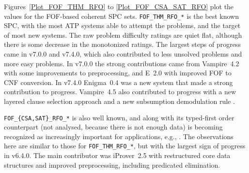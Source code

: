 \documentclass[runningheads]{llncs}
\begin{document}
Figures~\ref{Plot_FOF_THM_RFO} to \ref{Plot_FOF_CSA_SAT_RFO} plot the values for the FOF-based 
coherent SPC sets.
{\tt FOF\_THM\_RFO\_*} is the best known SPC, with the most ATP systems able to attempt the 
problems, and the target of most new systems.
The raw problem difficulty ratings are quiet flat, although there is some decrease in the
monotonized ratings.
The largest steps of progress came in v7.0.0 and v7.4.0, which also contributed to less unsolved
problems and more easy problems.
In v7.0.0 the strong contributions came from Vampire~4.2 with some improvements to preprocessing, 
and E~2.0 with improved FOF to CNF conversion.
In v7.4.0 Enigma~0.4 \cite{JU17,JC+20} was a new system that made a strong contribution to 
progress.
Vampire~4.5 also contributed to progress with a new layered clause selection approach 
\cite{GS20} and a new subsumption demodulation rule \cite{GKR20}.

{\tt FOF\_\{CSA,SAT\}\_RFO\_*} is also well known, and along with its typed-first order
counterpart (not analysed, because there is not enough data) is becoming recognized as 
increasingly important for applications, e.g., \cite{DKW08}.
The observations here are similar to those for {\tt FOF\_THM\_RFO\_*}, but with the largest
sign of progress in v6.4.0.
The main contributor was iProver~2.5 with restructured core data structures and improved 
preprocessing, including predicated elimination.
\end{document}
